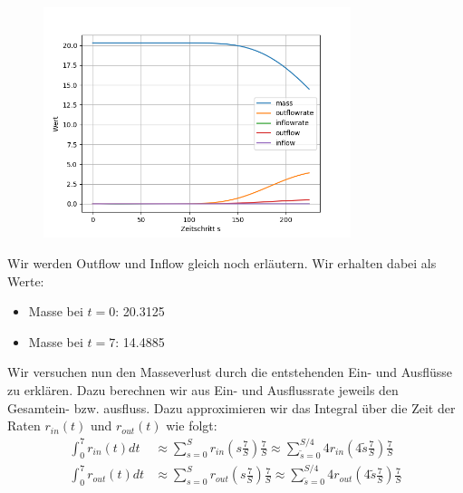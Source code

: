 \begin{figure}[H]
	\centering
	\includegraphics[width=0.8\textwidth]{../Aufgabe21/plotraten2.png}
\end{figure}
\remark Wir werden Outflow und Inflow gleich noch erläutern.
\newline
Wir erhalten dabei als Werte:
\begin{itemize}
	\item Masse bei $ t = 0 $: 20.3125
	\item Masse bei $ t = 7 $: 14.4885
\end{itemize}



Wir versuchen nun den Masseverlust durch die entstehenden Ein- und Ausflüsse zu erklären. Dazu berechnen wir aus Ein- und Ausflussrate jeweils den Gesamtein- bzw. ausfluss.
Dazu approximieren wir das Integral über die Zeit der Raten $r_{in}(t)$ und $r_{out}(t)$ wie folgt:
\begin{align*}
	\int_0^7 r_{in}(t) dt &\approx \sum\limits_{s = 0}^{S} r_{in}(s  \frac{7}{S})  \frac{7}{S} \approx  \sum\limits_{\tilde{s} = 0 }^{S / 4 } 4 r_{in}(4 \tilde{s}   \frac{7}{S})  \frac{7}{S}  \\
	\int_0^7 r_{out}(t) dt &\approx \sum\limits_{s = 0}^{S} r_{out}(s  \frac{7}{S})  \frac{7}{S} \approx  \sum\limits_{\tilde{s} = 0 }^{S / 4 } 4 r_{out}(4 \tilde{s}   \frac{7}{S})  \frac{7}{S} 
\end{align*}

